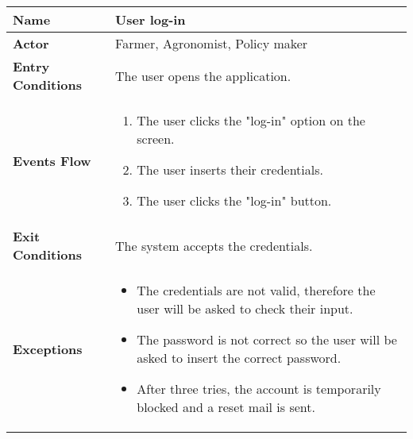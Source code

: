 
\begin{center}
\renewcommand{\arraystretch}{1.25}
\small
\begin{tabular}{|l|>{\raggedright\arraybackslash}m{12cm}|}
    \hline
    \textbf{Name} & User log-in\\
    \hline
   	\textbf{Actor} & Farmer, Agronomist, Policy maker\\
    \hline
    \textbf{Entry Conditions} & The user opens the application.\\
    \hline
    \textbf{Events Flow} & 
    \begin{enumerate}
            \item The user clicks the "log-in" option on the screen.
            \item The user inserts their credentials.
            \item The user clicks the "log-in" button.
     \end{enumerate}\\
    \hline
    \textbf{Exit Conditions} & The system accepts the credentials.\\
    \hline
    \textbf{Exceptions} & 
      \begin{itemize}
      	\item The credentials are not valid, therefore the user will be asked to check their input.
		\item The password is not correct so the user will be asked to insert the correct password. 			\item After three tries, the account is temporarily blocked and a reset mail is sent.
        \end{itemize}
     \\
    \hline
\end{tabular}
\end{center}